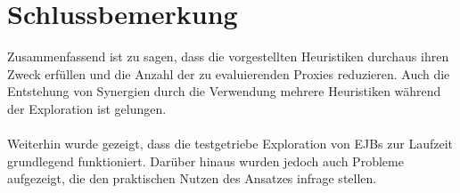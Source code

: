 \documentclass[a4paper,12pt]{book}
\begin{document}
\frontmatter

%

\tableofcontents

{}
\listoffigures

{}
\listoftables

{}
\lstlistoflistings



\mainmatter







\chapter{Schlussbemerkung}
Zusammenfassend ist zu sagen, dass die vorgestellten Heuristiken durchaus ihren Zweck erfüllen und die Anzahl der zu evaluierenden Proxies reduzieren. Auch die Entstehung von Synergien durch die Verwendung mehrere Heuristiken während der Exploration ist gelungen.
\\\\
Weiterhin wurde gezeigt, dass die testgetriebe Exploration von EJBs zur Laufzeit grundlegend funktioniert. Darüber hinaus wurden jedoch auch Probleme aufgezeigt, die den praktischen Nutzen des Ansatzes infrage stellen.

\appendix
{}
{}









%
%


%


\end{document}
